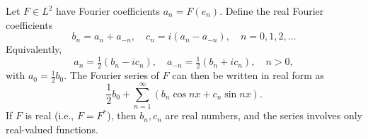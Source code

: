 Let $F \in L^2$ have Fourier coefficients $a_n = F(e_n)$. Define the real Fourier coefficients
$$b_n = a_n + a_{-n}, \quad c_n = i(a_n - a_{-n}), \quad n = 0, 1, 2, \ldots$$
Equivalently,
$$a_n = \tfrac{1}{2}(b_n - i c_n), \quad a_{-n} = \tfrac{1}{2}(b_n + i c_n), \quad n > 0,$$
with $a_0 = \tfrac{1}{2}b_0$. The Fourier series of $F$ can then be written in real form as
$$\frac{1}{2}b_0 + \sum_{n=1}^{\infty} \left( b_n \cos nx + c_n \sin nx \right).$$
If $F$ is real (i.e., $F = F^*$), then $b_n, c_n$ are real numbers, and the series involves only real-valued functions.
